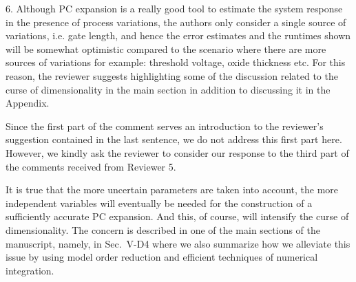 \begin{reviewer}
6. Although PC expansion is a really good tool to estimate the system response in the presence of process variations, the authors only consider a single source of variations, i.e. gate length, and hence the error estimates and the runtimes shown will be somewhat optimistic compared to the scenario where there are more sources of variations for example: threshold voltage, oxide thickness etc. For this reason, the reviewer suggests highlighting some of the discussion related to the curse of dimensionality in the main section in addition to discussing it in the Appendix.
\end{reviewer}
\begin{authors}
Since the first part of the comment serves an introduction to the reviewer's suggestion contained in the last sentence, we do not address this first part here.
However, we kindly ask the reviewer to consider our response to the third part of the comments received from Reviewer 5.

It is true that the more uncertain parameters are taken into account, the more independent variables will eventually be needed for the construction of a sufficiently accurate PC expansion.
And this, of course, will intensify the curse of dimensionality.
The concern is described in one of the main sections of the manuscript, namely, in Sec.~V-D4 where we also summarize how we alleviate this issue by using model order reduction and efficient techniques of numerical integration.

\end{authors}

